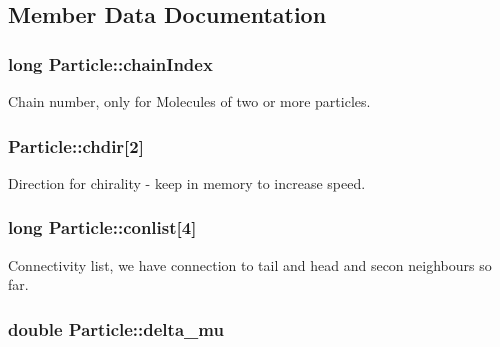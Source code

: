 \subsection{Member Data Documentation}
\hypertarget{class_particle_a9b75fd3fa9351d7d3fd7aa5a5170a809}{
\subsubsection[{chain\+Index}]{\setlength{\rightskip}{0pt plus 5cm}long Particle\+::chain\+Index}}\label{class_particle_a9b75fd3fa9351d7d3fd7aa5a5170a809}


Chain number, only for Molecules of two or more particles. 

\hypertarget{class_particle_adb1225ad15e081be7534279d63bcdf94}{
\subsubsection[{chdir}]{ Particle\+::chdir\mbox{[}2\mbox{]}}}\label{class_particle_adb1225ad15e081be7534279d63bcdf94}


Direction for chirality -\/ keep in memory to increase speed. 

\hypertarget{class_particle_aea82d73fc279e2b1d9d837e6a0873b30}{
\subsubsection[{conlist}]{\setlength{\rightskip}{0pt plus 5cm}long Particle\+::conlist\mbox{[}4\mbox{]}}}\label{class_particle_aea82d73fc279e2b1d9d837e6a0873b30}


Connectivity list, we have connection to tail and head and secon neighbours so far. 

\hypertarget{class_particle_a14464961ee5c7acbcfebddb72156e1bd}{
\subsubsection[{delta\+\_\+mu}]{\setlength{\rightskip}{0pt plus 5cm}double Particle\+::delta\+\_\+mu}}\label{class_particle_a14464961ee5c7acbcfebddb72156e1bd}



